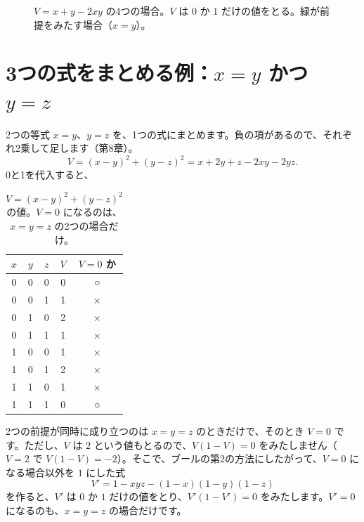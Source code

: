\documentclass[a4paper,11pt,openany]{ltjsbook}
\begin{document}
\begin{figure}[htbp]
\centering
{}
\caption{$V=x+y-2xy$ の4つの場合。$V$ は $0$ か $1$ だけの値をとる。緑が前提をみたす場合（$x=y$）。}
\end{figure}

\section{3つの式をまとめる例：$x=y$ かつ $y=z$}

2つの等式 $x=y$、$y=z$ を、1つの式にまとめます。負の項があるので、それぞれ2乗して足します（第8章）。
\[
V=(x-y)^2+(y-z)^2=x+2y+z-2xy-2yz .
\]
0と1を代入すると、

\begin{table}[htbp]
\centering
\begin{tabular}{ccc|cc}
\toprule
$x$ & $y$ & $z$ & $V$ & $V=0$ か\\
\midrule
0 & 0 & 0 & 0 & ○\\
0 & 0 & 1 & 1 & ×\\
0 & 1 & 0 & 2 & ×\\
0 & 1 & 1 & 1 & ×\\
1 & 0 & 0 & 1 & ×\\
1 & 0 & 1 & 2 & ×\\
1 & 1 & 0 & 1 & ×\\
1 & 1 & 1 & 0 & ○\\
\bottomrule
\end{tabular}
\caption{$V=(x-y)^2+(y-z)^2$ の値。$V=0$ になるのは、$x=y=z$ の2つの場合だけ。}
\end{table}

2つの前提が同時に成り立つのは $x=y=z$ のときだけで、そのとき $V=0$ です。ただし、$V$ は $2$ という値もとるので、$V(1-V)=0$ をみたしません（$V=2$ で $V(1-V)=-2$）。そこで、ブールの第2の方法にしたがって、$V=0$ になる場合以外を $1$ にした式
\[
V'=1-xyz-(1-x)(1-y)(1-z)
\]
を作ると、$V'$ は $0$ か $1$ だけの値をとり、$V'(1-V')=0$ をみたします。$V'=0$ になるのも、$x=y=z$ の場合だけです。
\end{document}
